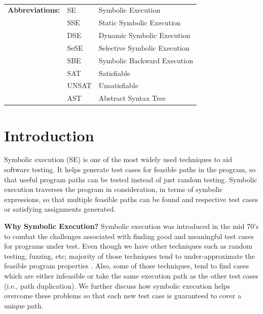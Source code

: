 \documentclass[11pt]{llncs}
\begin{document}
$\>$ $\>$ $\>$ 
	\begin{table}[!]	
		\centering
		\setlength{\tabcolsep}{6pt}
		\begin{tabular}{l l l}
			\textbf{Abbreviations:} & SE & Symbolic Execution\\
			& SSE & Static Symbolic Execution\\
			& DSE & Dynamic Symbolic Execution\\
			& SeSE & Selective Symbolic Execution\\
			& SBE & Symbolic Backward Execution\\
			& SAT & Satisfiable\\
			& UNSAT & Unsatisfiable\\
			& AST & Abstract Syntax Tree

		\end{tabular}
	\end{table}




\section{Introduction} \label{Introduction}
	Symbolic execution (SE) is one of the most widely used techniques to aid software testing. It helps generate test cases for feasible paths in the program, so that useful program paths can be tested instead of just random testing.\cite{4_TP_SE} Symbolic execution traverses the program in consideration, in terms of symbolic expressions, so that multiple feasible paths can be found and respective test cases or satisfying assignments generated.

	\vspace{2mm}

	\textbf{Why Symbolic Execution?} Symbolic execution was introduced in the mid 70’s\cite{2_Survey_SE} to combat the challenges associated with finding good and meaningful test cases for programs under test. Even though we have other techniques such as random testing, fuzzing, etc; majority of those techniques tend to under-approximate the feasible program properties \cite{2_Survey_SE}. Also, some of those techniques, tend to find cases which are either infeasible or take the same execution path as the other test cases (i.e., path duplication). We further discuss how symbolic execution helps overcome these problems so that each new test case is guaranteed to cover a unique path.
\end{document}
